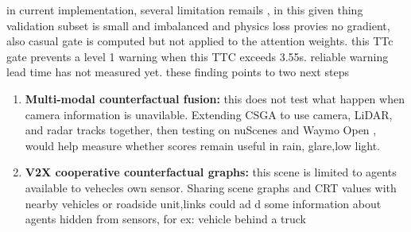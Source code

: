 in current implementation, several limitation remails , in this given thing validation subset is small and imbalanced and physics loss provies no gradient, also casual gate is computed but not applied to the attention weights. this TTc gate prevents a level 1 warning when this TTC exceeds 3.55s. reliable warning lead time has not measured yet. these finding points to two next steps
\begin{enumerate}
    \item \textbf{Multi-modal counterfactual fusion:} this does not test what happen when camera information is unavilable. Extending CSGA to use camera, LiDAR, and radar tracks together, then testing on nuScenes \cite{caesar2020nuscenes} and Waymo Open \cite{sun2020waymo}, would help measure whether scores remain useful in rain, glare,low light.
    \item \textbf{V2X cooperative counterfactual graphs:} this scene is limited to agents available to vehecles own sensor. Sharing scene graphs and CRT values with nearby vehicles or roadside unit,links could ad d some information about agents hidden from sensors, for ex: vehicle behind a truck
\end{enumerate}




